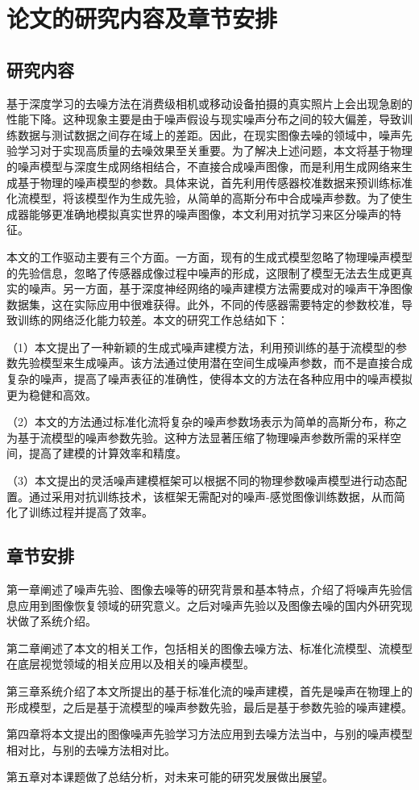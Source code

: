 \section{论文的研究内容及章节安排}

\subsection{研究内容}

基于深度学习的去噪方法在消费级相机或移动设备拍摄的真实照片上会出现急剧的性能下降。这种现象主要是由于噪声假设与现实噪声分布之间的较大偏差，导致训练数据与测试数据之间存在域上的差距。因此，在现实图像去噪的领域中，噪声先验学习对于实现高质量的去噪效果至关重要。为了解决上述问题，本文将基于物理的噪声模型与深度生成网络相结合，不直接合成噪声图像，而是利用生成网络来生成基于物理的噪声模型的参数。具体来说，首先利用传感器校准数据来预训练标准化流模型，将该模型作为生成先验，从简单的高斯分布中合成噪声参数。为了使生成器能够更准确地模拟真实世界的噪声图像，本文利用对抗学习来区分噪声的特征。

本文的工作驱动主要有三个方面。一方面，现有的生成式模型忽略了物理噪声模型的先验信息，忽略了传感器成像过程中噪声的形成，这限制了模型无法去生成更真实的噪声。另一方面，基于深度神经网络的噪声建模方法需要成对的噪声干净图像数据集，这在实际应用中很难获得。此外，不同的传感器需要特定的参数校准，导致训练的网络泛化能力较差。本文的研究工作总结如下：

（1）本文提出了一种新颖的生成式噪声建模方法，利用预训练的基于流模型的参数先验模型来生成噪声。该方法通过使用潜在空间生成噪声参数，而不是直接合成复杂的噪声，提高了噪声表征的准确性，使得本文的方法在各种应用中的噪声模拟更为稳健和高效。

（2）本文的方法通过标准化流将复杂的噪声参数场表示为简单的高斯分布，称之为基于流模型的噪声参数先验。这种方法显著压缩了物理噪声参数所需的采样空间，提高了建模的计算效率和精度。

（3）本文提出的灵活噪声建模框架可以根据不同的物理参数噪声模型进行动态配置。通过采用对抗训练技术，该框架无需配对的噪声-感觉图像训练数据，从而简化了训练过程并提高了效率。



\subsection{章节安排}

第一章阐述了噪声先验、图像去噪等的研究背景和基本特点，介绍了将噪声先验信息应用到图像恢复领域的研究意义。之后对噪声先验以及图像去噪的国内外研究现状做了系统介绍。

第二章阐述了本文的相关工作，包括相关的图像去噪方法、标准化流模型、流模型在底层视觉领域的相关应用以及相关的噪声模型。

第三章系统介绍了本文所提出的基于标准化流的噪声建模，首先是噪声在物理上的形成模型，之后是基于流模型的噪声参数先验，最后是基于参数先验的噪声建模。

第四章将本文提出的图像噪声先验学习方法应用到去噪方法当中，与别的噪声模型相对比，与别的去噪方法相对比。

第五章对本课题做了总结分析，对未来可能的研究发展做出展望。

